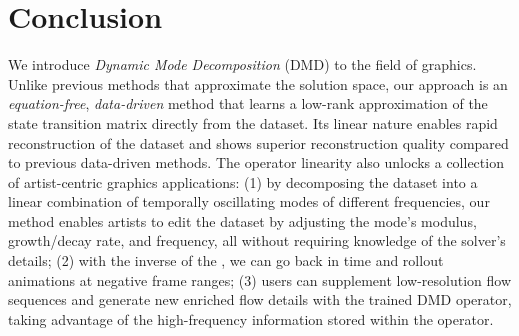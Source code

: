 \section{Conclusion}
We introduce \emph{Dynamic Mode Decomposition} (DMD) to the field of graphics. Unlike previous methods that approximate the solution space, our approach is an \emph{equation-free}, \emph{data-driven} method that learns a low-rank approximation of the state transition matrix directly from the dataset. Its linear nature enables rapid reconstruction of the dataset and shows superior reconstruction quality compared to previous data-driven methods. 
The operator linearity also unlocks a collection of artist-centric graphics applications: (1) by decomposing the dataset into a linear combination of temporally oscillating modes of different frequencies, our method enables artists to edit the dataset by adjusting the mode's modulus, growth/decay rate, and frequency, all without requiring knowledge of the solver's details; (2) with the inverse of the \koopman{}, we can go back in time and rollout animations at negative frame ranges; (3) users can supplement low-resolution flow sequences and generate new enriched flow details with the trained DMD operator, taking advantage of the high-frequency information stored within the operator.

